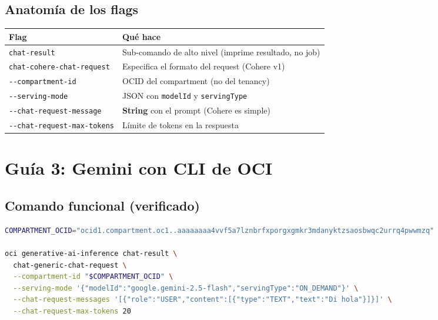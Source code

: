 \documentclass[11pt,a4paper,oneside]{article}
\begin{document}
\subsection{Anatomía de los flags}

\begin{center}
\small
\begin{tabular}{@{}lp{9cm}@{}}
\toprule
\textbf{Flag} & \textbf{Qué hace} \\
\midrule
\rowcolor{gray!10}
\texttt{chat-result} & Sub-comando de alto nivel (imprime resultado, no job) \\
\texttt{chat-cohere-chat-request} & Especifica el formato del request (Cohere v1) \\
\rowcolor{gray!10}
\texttt{-{}-compartment-id} & OCID del compartment (no del tenancy) \\
\texttt{-{}-serving-mode} & JSON con \texttt{modelId} y \texttt{servingType} \\
\rowcolor{gray!10}
\texttt{-{}-chat-request-message} & \textbf{String} con el prompt (Cohere es simple) \\
\texttt{-{}-chat-request-max-tokens} & Límite de tokens en la respuesta \\
\bottomrule
\end{tabular}
\end{center}

\section{Guía 3: Gemini con CLI de OCI}

\subsection{Comando funcional (verificado)}

\begin{lstlisting}[language=bash,caption={Test Gemini desde terminal}]
COMPARTMENT_OCID="ocid1.compartment.oc1..aaaaaaaa4vvf5a7lznbrfxporgxgmkr3mdanyktzsaosbwqc2urrq4pwwmzq"

oci generative-ai-inference chat-result \
  chat-generic-chat-request \
  --compartment-id "$COMPARTMENT_OCID" \
  --serving-mode '{"modelId":"google.gemini-2.5-flash","servingType":"ON_DEMAND"}' \
  --chat-request-messages '[{"role":"USER","content":[{"type":"TEXT","text":"Di hola"}]}]' \
  --chat-request-max-tokens 20
\end{lstlisting}
\end{document}
